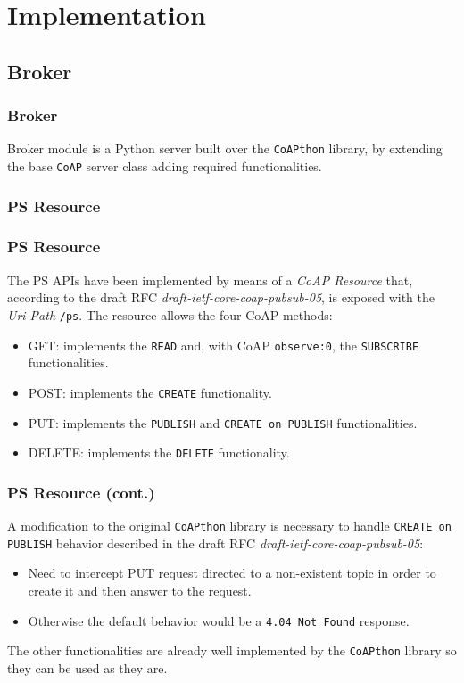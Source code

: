 \documentclass{beamer}
\begin{document}
\section{Implementation}

\subsection{Broker}
\begin{frame}
\frametitle{Broker}
Broker module is a Python server built over the \texttt{CoAPthon} library, by extending the base \texttt{CoAP} server class adding required functionalities.
\end{frame}

\subsubsection{PS Resource}
\begin{frame}
\frametitle{PS Resource}
The PS APIs have been implemented by means of a \textit{CoAP Resource} that, according to the draft RFC \textit{draft-ietf-core-coap-pubsub-05}, is exposed with the \textit{Uri-Path} \texttt{/ps}.
\pause
The resource allows the four CoAP methods:
\begin{itemize}
	\item GET: implements the \texttt{READ} and, with CoAP \texttt{observe:0}, the \texttt{SUBSCRIBE} functionalities.\pause

	\item POST: implements the \texttt{CREATE} functionality.\pause

	\item PUT: implements the \texttt{PUBLISH} and \texttt{CREATE on PUBLISH} functionalities.\pause

	\item DELETE: implements the \texttt{DELETE} functionality.
\end{itemize}
\end{frame}

\begin{frame}
\frametitle{PS Resource (cont.)}
A modification to the original \texttt{CoAPthon} library is necessary to handle \texttt{CREATE on PUBLISH} behavior described in the draft RFC \textit{draft-ietf-core-coap-pubsub-05}: \pause
\begin{itemize}
	\item Need to intercept PUT request directed to a non-existent topic in order to create it and then answer to the request. \pause
	\item Otherwise the default behavior would be a \texttt{4.04 Not Found} response.
\end{itemize}
\pause
The other functionalities are already well implemented by the \texttt{CoAPthon} library so they can be used as they are.
\end{frame}
\end{document}
